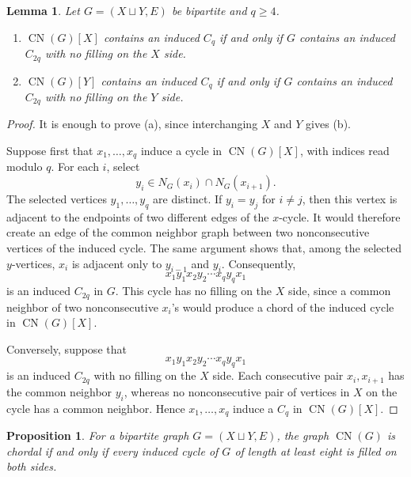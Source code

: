 \documentclass[11pt]{amsart}
\newtheorem{lemma}[theorem]{Lemma}
\newtheorem{proposition}[theorem]{Proposition}
\theoremstyle{definition}
\theoremstyle{remark}
\numberwithin{equation}{section}
\newcommand{\CN}{\operatorname{CN}}
\begin{document}
	\begin{lemma}\label{lem:cycle-correspondence}
		Let \(G=(X\sqcup Y,E)\) be bipartite and \(q\ge4\).
		\begin{enumerate}[label=\textup{(\alph*)}]
			\item \(\CN(G)[X]\) contains an induced \(C_q\) if and only if \(G\)
			contains an induced \(C_{2q}\) with no filling on the \(X\) side.
			\item \(\CN(G)[Y]\) contains an induced \(C_q\) if and only if \(G\)
			contains an induced \(C_{2q}\) with no filling on the \(Y\) side.
		\end{enumerate}
	\end{lemma}
	
	\begin{proof}
		It is enough to prove \textup{(a)}, since interchanging \(X\) and \(Y\)
		gives \textup{(b)}.
		
		Suppose first that \(x_1,\ldots,x_q\) induce a cycle in \(\CN(G)[X]\),
		with indices read modulo \(q\). For each \(i\), select
		\[
		y_i\in N_G(x_i)\cap N_G(x_{i+1}).
		\]
		The selected vertices \(y_1,\ldots,y_q\) are distinct. If
		\(y_i=y_j\) for \(i\ne j\), then this vertex is adjacent to the endpoints of
		two different edges of the \(x\)-cycle. It would therefore create an edge of
		the common neighbor graph between two nonconsecutive vertices of the induced
		cycle. The same argument shows that, among the selected \(y\)-vertices,
		\(x_i\) is adjacent only to \(y_{i-1}\) and \(y_i\). Consequently,
		\[
		x_1y_1x_2y_2\cdots x_qy_qx_1
		\]
		is an induced \(C_{2q}\) in \(G\). This cycle has no filling on the \(X\)
		side, since a common neighbor of two nonconsecutive \(x_i\)'s would produce a
		chord of the
		induced cycle in \(\CN(G)[X]\).
		
		Conversely, suppose that
		\[
		x_1y_1x_2y_2\cdots x_qy_qx_1
		\]
		is an induced \(C_{2q}\) with no filling on the \(X\) side. Each consecutive pair
		\(x_i,x_{i+1}\) has the common neighbor \(y_i\), whereas no nonconsecutive
		pair of vertices in \(X\) on the cycle has a common neighbor. Hence
		\(x_1,\ldots,x_q\) induce a \(C_q\) in \(\CN(G)[X]\).
	\end{proof}
	
	\begin{proposition}\label{prop:cycle-filling}
		For a bipartite graph \(G=(X\sqcup Y,E)\), the graph \(\CN(G)\) is chordal
		if and only if every induced cycle of \(G\) of length at least eight is
		filled on both sides.
	\end{proposition}
	
\end{document}
